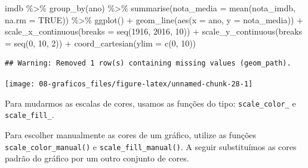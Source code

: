 \documentclass[
]{book}
\newenvironment{Shaded}{\begin{snugshade}}{\end{snugshade}}
\newcommand{\AttributeTok}[1]{\textcolor[rgb]{0.77,0.63,0.00}{#1}}
\newcommand{\ConstantTok}[1]{\textcolor[rgb]{0.00,0.00,0.00}{#1}}
\newcommand{\DecValTok}[1]{\textcolor[rgb]{0.00,0.00,0.81}{#1}}
\newcommand{\FunctionTok}[1]{\textcolor[rgb]{0.00,0.00,0.00}{#1}}
\newcommand{\NormalTok}[1]{#1}
\newcommand{\SpecialCharTok}[1]{\textcolor[rgb]{0.00,0.00,0.00}{#1}}
\begin{document}
\begin{Shaded}
\begin{Highlighting}[]
\NormalTok{imdb }\SpecialCharTok{\%\textgreater{}\%} 
  \FunctionTok{group\_by}\NormalTok{(ano) }\SpecialCharTok{\%\textgreater{}\%} 
  \FunctionTok{summarise}\NormalTok{(}\AttributeTok{nota\_media =} \FunctionTok{mean}\NormalTok{(nota\_imdb, }\AttributeTok{na.rm =} \ConstantTok{TRUE}\NormalTok{)) }\SpecialCharTok{\%\textgreater{}\%} 
  \FunctionTok{ggplot}\NormalTok{() }\SpecialCharTok{+}
  \FunctionTok{geom\_line}\NormalTok{(}\FunctionTok{aes}\NormalTok{(}\AttributeTok{x =}\NormalTok{ ano, }\AttributeTok{y =}\NormalTok{ nota\_media)) }\SpecialCharTok{+}
  \FunctionTok{scale\_x\_continuous}\NormalTok{(}\AttributeTok{breaks =} \FunctionTok{seq}\NormalTok{(}\DecValTok{1916}\NormalTok{, }\DecValTok{2016}\NormalTok{, }\DecValTok{10}\NormalTok{)) }\SpecialCharTok{+}
  \FunctionTok{scale\_y\_continuous}\NormalTok{(}\AttributeTok{breaks =} \FunctionTok{seq}\NormalTok{(}\DecValTok{0}\NormalTok{, }\DecValTok{10}\NormalTok{, }\DecValTok{2}\NormalTok{)) }\SpecialCharTok{+}
  \FunctionTok{coord\_cartesian}\NormalTok{(}\AttributeTok{ylim =} \FunctionTok{c}\NormalTok{(}\DecValTok{0}\NormalTok{, }\DecValTok{10}\NormalTok{))}
\end{Highlighting}
\end{Shaded}

\begin{verbatim}
## Warning: Removed 1 row(s) containing missing values (geom_path).
\end{verbatim}

\begin{center}\texttt{[image: 08-graficos\_files/figure-latex/unnamed-chunk-28-1]} \end{center}

Para mudarmos as escalas de cores, usamos as funções do tipo: \texttt{scale\_color\_} e \texttt{scale\_fill\_}.

Para escolher manualmente as cores de um gráfico, utilize as funções
\texttt{scale\_color\_manual()} e \texttt{scale\_fill\_manual()}. A seguir substituímos as cores padrão do gráfico por um outro conjunto de cores.
\end{document}

